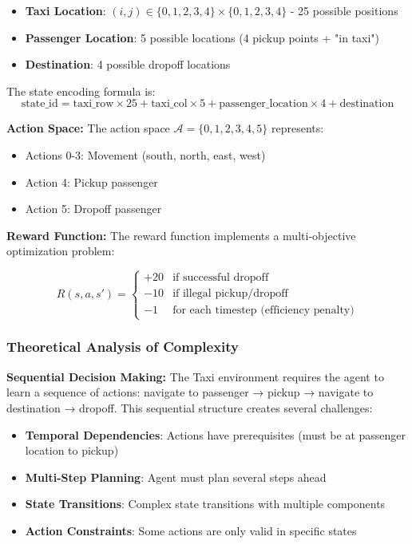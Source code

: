 \documentclass[12pt]{article}
\begin{document}
{{{\begin{itemize}
    \item \textbf{Taxi Location}: $(i,j) \in \{0,1,2,3,4\} \times \{0,1,2,3,4\}$ - 25 possible positions
    \item \textbf{Passenger Location}: 5 possible locations (4 pickup points + "in taxi")
    \item \textbf{Destination}: 4 possible dropoff locations
\end{itemize}

The state encoding formula is:
\begin{equation}
\text{state\_id} = \text{taxi\_row} \times 25 + \text{taxi\_col} \times 5 + \text{passenger\_location} \times 4 + \text{destination}
\end{equation}

\textbf{Action Space:}
The action space $\mathcal{A} = \{0, 1, 2, 3, 4, 5\}$ represents:
\begin{itemize}
    \item Actions 0-3: Movement (south, north, east, west)
    \item Action 4: Pickup passenger
    \item Action 5: Dropoff passenger
\end{itemize}

\textbf{Reward Function:}
The reward function implements a multi-objective optimization problem:

\begin{equation}
R(s,a,s') = \begin{cases}
+20 & \text{if successful dropoff} \\
-10 & \text{if illegal pickup/dropoff} \\
-1 & \text{for each timestep (efficiency penalty)}
\end{cases}
\end{equation}

\subsubsection{Theoretical Analysis of Complexity}

\textbf{Sequential Decision Making:}
The Taxi environment requires the agent to learn a sequence of actions: navigate to passenger → pickup → navigate to destination → dropoff. This sequential structure creates several challenges:

\begin{itemize}
    \item \textbf{Temporal Dependencies}: Actions have prerequisites (must be at passenger location to pickup)
    \item \textbf{Multi-Step Planning}: Agent must plan several steps ahead
    \item \textbf{State Transitions}: Complex state transitions with multiple components
    \item \textbf{Action Constraints}: Some actions are only valid in specific states
\end{itemize}

}}}
\end{document}
